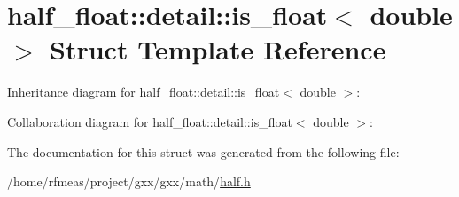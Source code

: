 \hypertarget{structhalf__float_1_1detail_1_1is__float_3_01double_01_4}{}\section{half\+\_\+float\+:\+:detail\+:\+:is\+\_\+float$<$ double $>$ Struct Template Reference}
\label{structhalf__float_1_1detail_1_1is__float_3_01double_01_4}


Inheritance diagram for half\+\_\+float\+:\+:detail\+:\+:is\+\_\+float$<$ double $>$\+:


Collaboration diagram for half\+\_\+float\+:\+:detail\+:\+:is\+\_\+float$<$ double $>$\+:


The documentation for this struct was generated from the following file\+:\begin{DoxyCompactItemize}
\item 
/home/rfmeas/project/gxx/gxx/math/\hyperlink{half_8h}{half.\+h}\end{DoxyCompactItemize}
